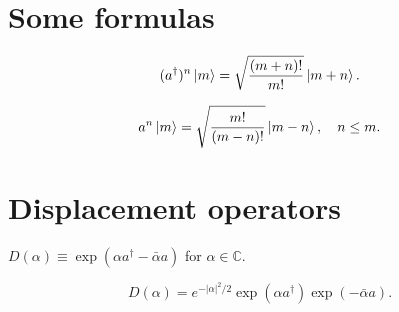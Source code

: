 \documentclass[a4paper]{report}
\newcommand{\CC}{\mathbb{C}}
\begin{document}
\section{Some formulas}

\begin{equation}
	(a^\dagger)^n \ket m 
	= \sqrt{\frac{(m+n)!}{m!}} \ket{m+n}.
\end{equation}

\begin{equation}
	a^n \ket m = \sqrt{\frac{m!}{(m-n)!}} \ket{m-n},\quad n\le m.
\end{equation}

\section{Displacement operators}

\begin{defn}
	$D(\alpha) \equiv \exp(\alpha a^\dagger-\bar\alpha a)$ for $\alpha\in\CC$.
\end{defn}

\begin{prop}
	\begin{equation}
		D(\alpha)
		= e^{-\lvert\alpha\rvert^2/2}
			\exp(\alpha a^\dagger)\exp(-\bar\alpha a).
	\end{equation}
\end{prop}
\end{document}
